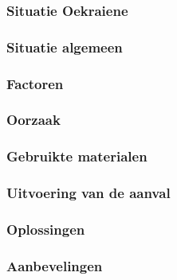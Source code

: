 \cite{greenberg2017Cyberwartestlab}

\cite{boozallen2016lightwentout}
\cite{finkle08012016russiansandwormhackers}
\cite{zinets15022017ukrainechargesrussia}
\cite{mcelfresh2016cyberattackhowandwhy}
\cite{parkwalstorm11102017russiagridattack}
\subsubsection{Situatie Oekraiene}

\cite{drago2017CrashOverride}
\cite{slowik2019ReassasUkraine2016Attack}
\subsubsection{Situatie algemeen}

\cite{cerulus2019FrontlineRussiaAttack}
\cite{desarnaud2017cyberattacks}
\cite{dragos2019TargetedTransStation}
\subsubsection{Factoren}

\cite{shehod2016gridadvantageus}
\subsubsection{Oorzaak}

\cite{rocha2017cybersecyrityanalysisScada}
\cite{2017crashoverridenostuxnet}
\cite{vijayan2017firstmalwareCausedOutage}
\cite{slowik2019ReassasUkraine2016Attack}
\subsubsection{Gebruikte materialen}

\cite{2015ukrainegridattack}
\cite{industroyershortfact}

\subsubsection{Uitvoering van de aanval}

\cite{Whitehead2017ukrainepoweroutage}
\cite{boozallen2016lightwentout}
\subsubsection{Oplossingen}

\cite{Whitehead2017ukrainepoweroutage}

\subsubsection{Aanbevelingen}

